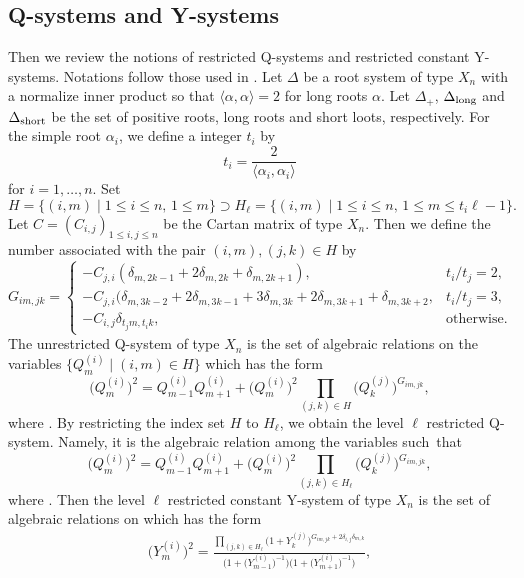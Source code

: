 \documentclass[pdftex]{sigma}
\numberwithin{equation}{section}
\newcommand{\pair}[1]{\langle{#1}\rangle}
\begin{document}
	\subsection{Q-systems and Y-systems}
Then we review the notions of restricted Q-systems and restricted constant Y-systems.
Notations follow those used in \cite{KNS}.
Let $\Delta$ be a root system of type $X_n$ with a normalize inner product so that $\pair{\alpha,\alpha}=2$ for long roots $\alpha$.
Let $\Delta_+$, $\Delta_{{\rm long}}$ and $\Delta_{{\rm short}}$ be the set of positive roots, long roots and short loots, respectively.
For the simple root $\alpha_i$, we define a integer $t_i$ by
		\[t_i=\frac{2}{\pair{\alpha_i,\alpha_i}}\]
for $i=1,\dots,n$.
Set
	\[H=\{(i,m)\mid 1\leq i\leq n,\, 1\leq m\}\supset H_\ell=\{(i,m)\mid1\leq i\leq n,\, 1\leq m\leq t_i\ell-1\}.\]
Let $C=(C_{i,j})_{1\leq i,j\leq n}$ be the Cartan matrix of type $X_n$.
Then we define the number associated with the pair $(i,m),(j,k)\in H$ by
	\[G_{im,jk}=
		\begin{cases}
		-C_{j,i}(\delta_{m,2k-1}+2\delta_{m,2k}+\delta_{m,2k+1}),& t_i/t_j=2,\\
		-C_{j,i}(\delta_{m,3k-2}+2\delta_{m,3k-1}+3\delta_{m,3k}+2\delta_{m,3k+1}+\delta_{m,3k+2},& t_i/t_j=3,\\
		-C_{i,j}\delta_{t_jm,t_ik},& \text{otherwise}.
		\end{cases}\]
The unrestricted Q-system of type $X_n$ is the set of algebraic relations on the variables $\bigl\{Q_m^{(i)}\mid(i,m)\in H\bigr\}$ which has the form
	\[\bigl(Q_m^{(i)}\bigr)^2=Q_{m-1}^{(i)}Q_{m+1}^{(i)}+\bigl(Q_m^{(i)}\bigr)^2\prod_{(j,k)\in H}\bigl(Q_k^{(j)}\bigr)^{G_{im,jk}},\]
where .
By restricting the index set $H$ to $H_\ell$, we obtain the level $\ell$ restricted Q-system.
Namely, it is the algebraic relation among the variables  such~that
	\[\bigl(Q_m^{(i)}\bigr)^2=Q_{m-1}^{(i)}Q_{m+1}^{(i)}+\bigl(Q_m^{(i)}\bigr)^2\prod_{(j,k)\in H_\ell}\bigl(Q_k^{(j)}\bigr)^{G_{im,jk}},\]
where .
Then the level $\ell$ restricted constant Y-system of type $X_n$ is the set of algebraic relations on  which has the form
	\begin{align}\label{Y-sys}
	\bigl(Y_m^{(i)}\bigr)^2=\frac{\prod_{(j,k)\in H_\ell}\bigl(1+Y_k^{(j)}\bigr)^{G_{im,jk}+2\delta_{i,j}\delta_{m,k}}}{\bigl(1+\bigl(Y_{m-1}^{(i)}\bigr)^{-1}\bigr)\bigl(1+\bigl(Y_{m+1}^{(i)}\bigr)^{-1}\bigr)},
	\end{align}
\end{document}
